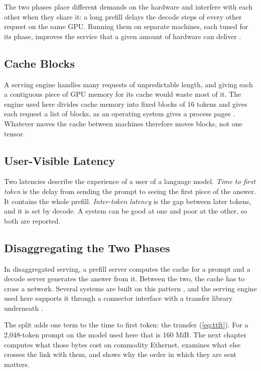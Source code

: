 The two phases place different demands on the hardware and interfere with each other when they share it: a long prefill delays the decode steps of
every other request on the same GPU. Running them on separate machines, each
tuned for its phase, improves the service that a given amount of hardware can
deliver \citep{patel2024splitwise,zhong2024distserve}.

\subsection{Cache Blocks}

A serving engine handles many requests of unpredictable length, and giving
each a contiguous piece of GPU memory for its cache would waste most of it.
The engine used here divides cache memory into fixed blocks of 16
tokens and gives each request a list of blocks, as an operating system gives
a process pages \citep{kwon2023vllm}. Whatever moves the cache between
machines therefore moves blocks, not one tensor.

\subsection{User-Visible Latency}

Two latencies describe the experience of a user of a language model. \emph{Time
to first token} is the delay from sending the prompt to seeing the first
piece of the answer. It contains the whole prefill. \emph{Inter-token latency}
is the gap between later tokens, and it is set by decode. A system can be
good at one and poor at the other, so both are reported.

\subsection{Disaggregating the Two Phases}

In disaggregated serving, a prefill server computes the cache for a prompt
and a decode server generates the answer from it. Between the two, the cache
has to cross a network. Several systems are built on this pattern
\citep{zhong2024distserve,patel2024splitwise,qin2024mooncake,dynamo}, and
the serving engine used here supports it through a connector interface with
a transfer library underneath \citep{vllm_disagg,nixl}.

The split adds one term to the time to first token: the transfer
(\cref{eq:ttft}). For a 2,048-token prompt on the model used here that is 160 MiB.
The next chapter computes what those bytes cost on commodity Ethernet,
examines what else crosses the link with them, and shows why the order in
which they are sent matters.
